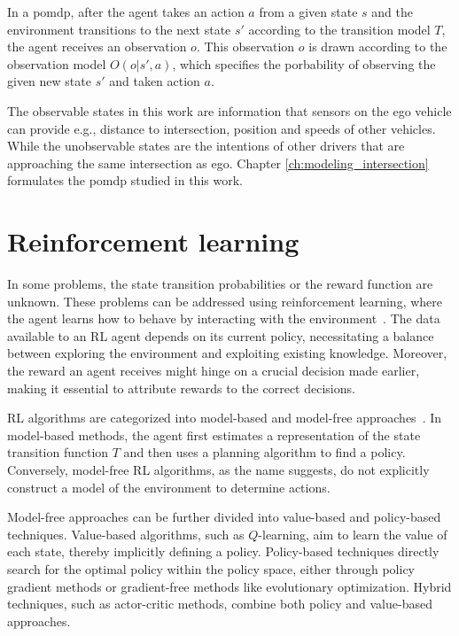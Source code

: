 In a \gls{pomdp}, after the agent takes an action $a$ from a given state $s$ and the environment transitions to the next state $s'$ according to the transition model $T$, the agent receives an observation $o$. This observation $o$ is drawn according to the observation model $O(o|s',a)$, which specifies the porbability of observing the given new state $s'$ and taken action $a$.

The observable states in this work are information that sensors on the ego vehicle can provide e.g., distance to intersection, position and speeds of other vehicles. While the unobservable states are the intentions of other drivers that are approaching the same intersection as ego. Chapter \ref{ch:modeling_intersection} formulates the \gls{pomdp} studied in this work. 


\section{Reinforcement learning}
In some problems, the state transition probabilities or the reward function are unknown. These problems can be addressed using reinforcement learning, where the agent learns how to behave by interacting with the environment~\cite[Ch. 5]{Kochenderfer2015}. The data available to an RL agent depends on its current policy, necessitating a balance between exploring the environment and exploiting existing knowledge. Moreover, the reward an agent receives might hinge on a crucial decision made earlier, making it essential to attribute rewards to the correct decisions.

RL algorithms are categorized into model-based and model-free approaches~\cite[Ch. 5]{Kochenderfer2015}. In model-based methods, the agent first estimates a representation of the state transition function $T$ and then uses a planning algorithm to find a policy. Conversely, model-free RL algorithms, as the name suggests, do not explicitly construct a model of the environment to determine actions.

Model-free approaches can be further divided into value-based and policy-based techniques. Value-based algorithms, such as $Q$-learning, aim to learn the value of each state, thereby implicitly defining a policy. Policy-based techniques directly search for the optimal policy within the policy space, either through policy gradient methods or gradient-free methods like evolutionary optimization. Hybrid techniques, such as actor-critic methods, combine both policy and value-based approaches.

